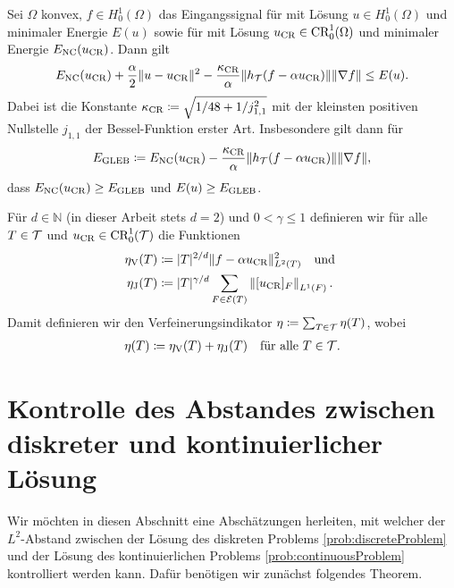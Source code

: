 \begin{theorem}
  \label{thm:gleb}
  Sei $\Omega$ konvex, $f\in H^1_0(\Omega)$ das Eingangssignal für
   mit Lösung $u\in H^1_0(\Omega)$ und minimaler
  Energie $E(u)$ sowie für  mit Lösung $u_\textup{CR}\in
  \textup{CR}^1_0(\Omega)$ und minimaler Energie $E_\textup{NC}(u_\textup{CR})$.
  Dann gilt
  \begin{align*}
    E_\textup{NC}(u_\textup{CR})+\frac{\alpha}{2}\Vert u-u_\textup{CR}\Vert^2
    -\frac{\kappa_{\textup{CR}}}{\alpha}\Vert
    h_{\mathcal{T}}(f-\alpha u_\textup{CR})\Vert \Vert\nabla f\Vert\leq E(u).
  \end{align*}
  Dabei ist die Konstante $\kappa_{\textup{CR}}\coloneqq\sqrt{1/48+1/j_{1,1}^2}$ mit der
  kleinsten positiven Nullstelle $j_{1,1}$ der Bessel-Funktion erster Art.
  Insbesondere gilt dann für 
  \begin{align}
    \label{eq:gleb}
    E_\textup{GLEB} 
    \coloneqq 
    E_\textup{NC}(u_\textup{CR}) - \frac{\kappa_{\textup{CR}}}{\alpha}\Vert h_{\mathcal{T}}(f-\alpha u_\textup{CR})\Vert
    \Vert \nabla f\Vert,
  \end{align}
    dass $E_\textup{NC}(u_\textup{CR})\geq E_\textup{GLEB}$ und $E(u)\geq E_\textup{GLEB}$.
\end{theorem}

\begin{definition}[Verfeinerungsindikator]
  \label{def:refinementIndicator}
  Für $d\in\mathbb{N}$ (in dieser Arbeit stets $d=2$) und $0<\gamma\leq 1$
  definieren wir für alle $T\in\mathcal{T}$ und $u_\textup{CR}\in\textup{CR}^1_0(\mathcal{T})$ die
  Funktionen
  \begin{align*}
    \eta_\text{V}(T)
    &\coloneqq
    |T|^{2/d}\Vert f-\alpha u_\textup{CR}\Vert^2_{L^2(T)}\quad\text{und }\\
    \eta_\text{J}(T)
    &\coloneqq
    |T|^{\gamma/d}\sum_{F\in\mathcal{E}(T)}\left\Vert [u_\textup{CR}]_F\right\Vert_{L^1(F)}.
  \end{align*} 
  Damit definieren wir den Verfeinerungsindikator
  $\eta\coloneqq\sum_{T\in\mathcal{T}}\eta(T)$, wobei
  \begin{align} \label{eq:refinementIndicator} 
    \eta (T)
    \coloneqq
    \eta_\text{V}(T) + \eta_\text{J}(T)\quad\text{für alle } T\in\mathcal{T}.
  \end{align} 
\end{definition}

\section{Kontrolle des Abstandes zwischen diskreter und kontinuierlicher
Lösung}
Wir möchten in diesen Abschnitt eine Abschätzungen herleiten, mit welcher
der $L^2$-Abstand zwischen der Lösung des diskreten Problems
\ref{prob:discreteProblem} und der Lösung des kontinuierlichen Problems
\ref{prob:continuousProblem} kontrolliert werden kann.
Dafür benötigen wir zunächst folgendes Theorem.

